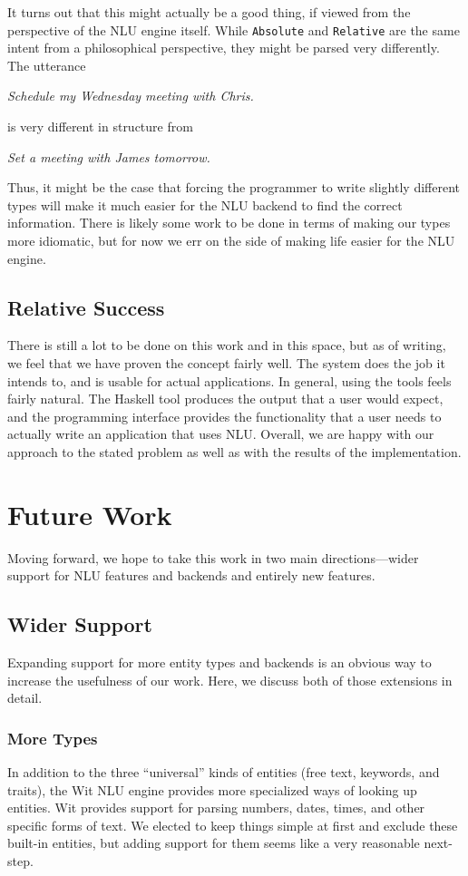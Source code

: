 \documentclass[twocolumn]{article}
\newcommand{\ts}[1]{\texttt{#1}}
\begin{document}
It turns out that this might actually be a good thing, if viewed from the
perspective of the NLU engine itself. While \ts{Absolute} and \ts{Relative} are
the same intent from a philosophical perspective, they might be parsed very
differently. The utterance
\begin{center}
  \emph{Schedule my Wednesday meeting with Chris.}
\end{center}
is very different in structure from
\begin{center}
  \emph{Set a meeting with James tomorrow.}
\end{center}
Thus, it might be the case that forcing the programmer to write slightly
different types will make it much easier for the NLU backend to find the correct
information. There is likely some work to be done in terms of making our types
more idiomatic, but for now we err on the side of making life easier for the NLU
engine.

\subsection{Relative Success}
There is still a lot to be done on this work and in this space, but as of
writing, we feel that we have proven the concept fairly well. The system does
the job it intends to, and is usable for actual applications. In general, using
the tools feels fairly natural. The Haskell tool produces the output that a user
would expect, and the programming interface provides the functionality that a
user needs to actually write an application that uses NLU. Overall, we are happy
with our approach to the stated problem as well as with the results of the
implementation.

\section{Future Work} \label{future}
Moving forward, we hope to take this work in two main directions---wider support
for NLU features and backends and entirely new features.

\subsection{Wider Support}
Expanding support for more entity types and backends is an obvious way to
increase the usefulness of our work. Here, we discuss both of those extensions
in detail.

\subsubsection{More Types} \label{future>types}
In addition to the three ``universal'' kinds of entities (free text, keywords,
and traits), the Wit NLU engine provides more specialized ways of looking up
entities. Wit provides support for parsing numbers, dates, times, and other
specific forms of text. We elected to keep things simple at first and exclude
these built-in entities, but adding support for them seems like a very
reasonable next-step.
\end{document}
